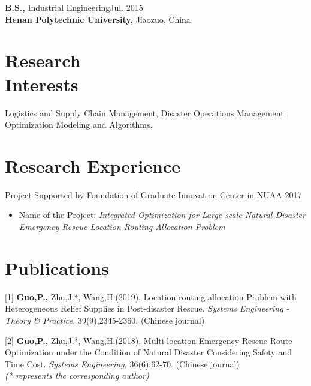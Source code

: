 \documentclass[margin]{res}
\begin{document}
\begin{resume}
{\bf B.S.,}  Industrial Engineering\hfill Jul. 2015 \\
{\bf Henan Polytechnic University,} Jiaozuo, China


\section{\sc Research \\Interests}
Logistics and Supply Chain Management, Disaster Operations Management, Optimization Modeling and Algorithms.


\section{\sc Research Experience}
Project Supported by Foundation of Graduate Innovation Center in NUAA \hfill 2017
\begin{itemize} \itemsep -2pt  %
\item Name of the Project: {\it Integrated Optimization for Large-scale Natural Disaster Emergency Rescue Location-Routing-Allocation Problem}
\end{itemize}


\section{\sc Publications}
[1] \textbf{Guo,P.,} Zhu,J.*, Wang,H.(2019). Location-routing-allocation Problem with Heterogeneous Relief Supplies in Post-disaster Rescue. \textit{Systems Engineering - Theory \& Practice,} 39(9),2345-2360. (Chinese journal)

[2] \textbf{Guo,P.,} Zhu,J.*, Wang,H.(2018). Multi-location Emergency Rescue Route Optimization under the Condition of Natural Disaster Considering Safety and Time Cost. \textit{Systems Engineering,} 36(6),62-70. (Chinese journal) \\
\textit{(* represents the corresponding author)}



\end{resume}
\end{document}

